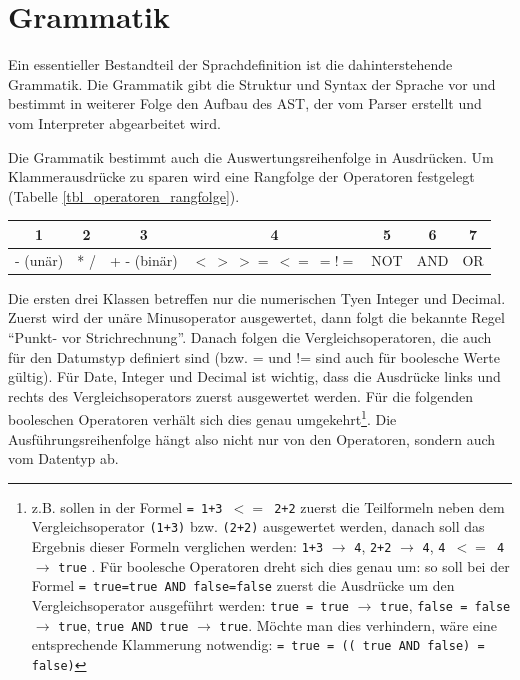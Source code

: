   	





\section{Grammatik}
\label{design_grammatik}

Ein essentieller Bestandteil der Sprachdefinition ist die dahinterstehende Grammatik. Die Grammatik gibt die Struktur und Syntax der Sprache vor und bestimmt in weiterer Folge den Aufbau des AST, der vom Parser erstellt und vom Interpreter abgearbeitet wird.

Die Grammatik bestimmt auch die Auswertungsreihenfolge in Ausdrücken. Um Klammerausdrücke zu sparen wird eine Rangfolge der Operatoren festgelegt (Tabelle \ref{tbl_operatoren_rangfolge}).

\begin{center}
\label{tbl_operatoren_rangfolge}
\begin{tabular}[ht]{|c | c | c | c | c | c | c |}
\hline
1 & 2 & 3 & 4 & 5 & 6 & 7 \\
\hline
- (unär) & * / & + - (binär) & $< \ > \ >= \ <= \ =  !=$ & NOT & AND & OR\\
\hline
\end{tabular}
\end{center}

Die ersten drei Klassen betreffen nur die numerischen Tyen Integer und Decimal. Zuerst wird der unäre Minusoperator ausgewertet, dann folgt die bekannte Regel ``Punkt- vor Strichrechnung''. Danach folgen die Vergleichsoperatoren, die auch für den Datumstyp definiert sind (bzw. = und != sind auch für boolesche Werte gültig). Für Date, Integer und Decimal ist wichtig, dass die Ausdrücke links und rechts des Vergleichsoperators zuerst ausgewertet werden. Für die folgenden booleschen Operatoren verhält sich dies genau umgekehrt\footnote{z.B. sollen in der Formel \texttt{= 1+3 $<=$ 2+2} zuerst die Teilformeln neben dem Vergleichsoperator \texttt{(1+3)} bzw. \texttt{(2+2)} ausgewertet werden, danach soll das Ergebnis dieser Formeln verglichen werden: \texttt{1+3} $\rightarrow$ \texttt{4}, \texttt{2+2} $\rightarrow$ \texttt{4}, \texttt{4 $<=$ 4} $\rightarrow$ \texttt{true} . Für boolesche Operatoren dreht sich dies genau um: so soll bei der Formel \texttt{= true=true AND false=false} zuerst die Ausdrücke um den Vergleichsoperator ausgeführt werden: \texttt{true = true} $\rightarrow$ \texttt{true}, \texttt{false = false} $\rightarrow$ \texttt{true}, \texttt{true AND true} $\rightarrow$ \texttt{true}. Möchte man dies verhindern, wäre eine entsprechende Klammerung notwendig: \texttt{= true = (( true AND false) = false)}}. Die Ausführungsreihenfolge hängt also nicht nur von den Operatoren, sondern auch vom Datentyp ab.

